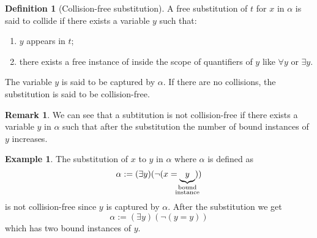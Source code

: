 \documentclass[11pt,a4paper]{article}
\theoremstyle{definition}
\newtheorem{definition}{Definition}[section]
\newtheorem{remark}{Remark}[section]
\newtheorem{example}{Example}[section]
\theoremstyle{plain}
\begin{document}
  \begin{definition}[Collision-free substitution]
    A free substitution of $t$ for $x$ in $\alpha$ is said to collide 
    if there exists a variable $y$ such that:
    \begin{enumerate}
      \item [(1)] $y$ appears in $t$;
      \item [(2)] there exists a free instance of inside the scope of
        quantifiers of $y$ like $\forall y$ or $\exists y$.
    \end{enumerate}
    The variable $y$ is said to be captured by $\alpha$.
    If there are no collisions, the substitution is said to be 
    collision-free.
  \end{definition}

  \begin{remark}
    We can see that a subtitution is not collision-free if there exists
    a variable $y$ in $\alpha$ such that after the substitution the number
    of bound instances of $y$ increases.
  \end{remark}

  \begin{example}
    The substitution of $x$ to $y$ in $\alpha$ where $\alpha$ is defined
    as
    \[
      \alpha := (\exists y)(\neg (x = \underbrace{y}_{\mathclap{
      \substack{\text{bound} \\ \text{instance}}}}))
    \]
    is not collision-free since $y$ is captured by $\alpha$.
    After the substitution we get
    \[
      \alpha := (\exists y)(\neg (y = y))
    \]
    which has two bound instances of $y$.
  \end{example}
\end{document}
